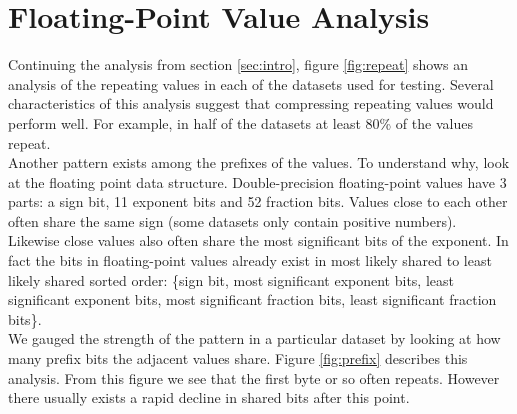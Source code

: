 \section{Floating-Point Value Analysis}
\label{sec:analysis}
Continuing the analysis from section \ref{sec:intro}, figure \ref{fig:repeat} shows an analysis of the repeating values in each of the datasets used for testing. Several characteristics of this analysis suggest that compressing repeating values would perform well. For example, in half of the datasets at least 80\% of the values repeat.\\
\indent
Another pattern exists among the prefixes of the values. To understand why, look at the floating point data structure. Double-precision floating-point values have 3 parts: a sign bit, 11 exponent bits and 52 fraction bits. Values close to each other often share the same sign (some datasets only contain positive numbers). Likewise close values also often share the most significant bits of the exponent. In fact the bits in floating-point values already exist in most likely shared to least likely shared sorted order: \{sign bit, most significant exponent bits, least significant exponent bits, most significant fraction bits, least significant fraction bits\}.\\
\indent We gauged the strength of the pattern in a particular dataset by looking at how many prefix bits the adjacent values share. Figure \ref{fig:prefix} describes this analysis. From this figure we see that the first byte or so often repeats. However there usually exists a rapid decline in shared bits after this point.\\
%
